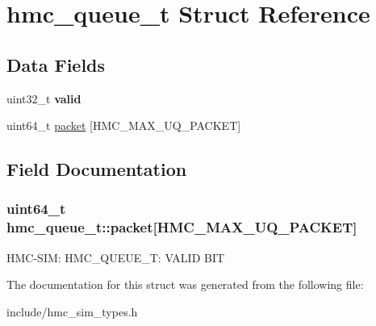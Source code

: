 \hypertarget{structhmc__queue__t}{\section{hmc\-\_\-queue\-\_\-t Struct Reference}
\label{structhmc__queue__t}
}
\subsection*{Data Fields}
\begin{DoxyCompactItemize}
\item 
\hypertarget{structhmc__queue__t_a918387a1b867fe1f6e1929254e547fc0}{uint32\-\_\-t {\bfseries valid}}\label{structhmc__queue__t_a918387a1b867fe1f6e1929254e547fc0}

\item 
uint64\-\_\-t \hyperlink{structhmc__queue__t_a1528cdf06246a5e4f8060aa1115728ad}{packet} \mbox{[}H\-M\-C\-\_\-\-M\-A\-X\-\_\-\-U\-Q\-\_\-\-P\-A\-C\-K\-E\-T\mbox{]}
\end{DoxyCompactItemize}


\subsection{Field Documentation}
\hypertarget{structhmc__queue__t_a1528cdf06246a5e4f8060aa1115728ad}{
\subsubsection[{packet}]{\setlength{\rightskip}{0pt plus 5cm}uint64\-\_\-t hmc\-\_\-queue\-\_\-t\-::packet\mbox{[}H\-M\-C\-\_\-\-M\-A\-X\-\_\-\-U\-Q\-\_\-\-P\-A\-C\-K\-E\-T\mbox{]}}}\label{structhmc__queue__t_a1528cdf06246a5e4f8060aa1115728ad}
H\-M\-C-\/\-S\-I\-M\-: H\-M\-C\-\_\-\-Q\-U\-E\-U\-E\-\_\-\-T\-: V\-A\-L\-I\-D B\-I\-T 

The documentation for this struct was generated from the following file\-:\begin{DoxyCompactItemize}
\item 
include/hmc\-\_\-sim\-\_\-types.\-h\end{DoxyCompactItemize}
